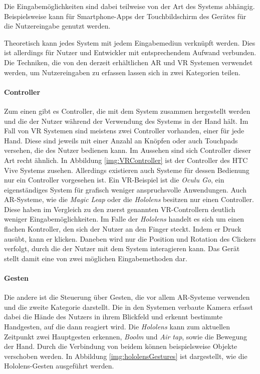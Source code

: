 Die Eingabemöglichkeiten sind dabei teilweise von der Art des Systems abhängig. 
Beispielsweise kann für Smartphone-Apps der Touchbildschirm des Gerätes für die Nutzereingabe genutzt werden. 

Theoretisch kann jedes System mit jedem Eingabemediun verknüpft werden. Dies ist allerdings für Nutzer und Entwickler mit entsprechendem Aufwand verbunden. Die Techniken, die von den derzeit erhältlichen AR und VR Systemen verwendet werden, um Nutzereingaben zu erfassen lassen sich in zwei Kategorien teilen. 
\paragraph{Controller}
Zum einen gibt es Controller, die mit dem System zusammen hergestellt werden und die der Nutzer während der Verwendung des Systems in der Hand hält. Im Fall von VR Systemen sind meistens zwei Controller vorhanden, einer für jede Hand. Diese sind jeweils mit einer Anzahl an Knöpfen oder auch Touchpads versehen, die des Nutzer bedienen kann. Im Aussehen sind sich Controller dieser Art recht ähnlich. In Abbildung \ref{img:VRController} ist der Controller des HTC Vive Systems zusehen.
Allerdings existieren auch Systeme für dessen Bedienung nur ein Controller vorgesehen ist. Ein VR-Beispiel ist die \textit{Oculu Go}, ein eigenständiges System für grafisch weniger anspruchsvolle Anwendungen. 
Auch AR-Systeme, wie die \textit{Magic Leap} oder die \textit{Hololens} besitzen nur einen Controller. Diese haben im Vergleich zu den zuerst genannten VR-Controllern deutlich weniger Eingabemöglichkeiten. Im Falle der \textit{Hololens} handelt es sich um einen flachen Kontroller, den sich der Nutzer an den Finger steckt. Indem er Druck ausübt, kann er klicken. Daneben wird nur die Position und Rotation des Clickers verfolgt, durch die der Nutzer mit dem System interagieren kann. Das Gerät stellt damit eine von zwei möglichen Eingabemethoden dar. 

\paragraph{Gesten}
Die andere ist die Steuerung über Gesten, die vor allem AR-Systeme verwenden und die zweite Kategorie darstellt.
Die in den Systemen verbaute Kamera erfasst dabei die Hände des Nutzers in ihrem Blickfeld und erkennt bestimmte Handgesten, auf die dann reagiert wird. 
Die \textit{Hololens} kann zum aktuellen Zeitpunkt zwei Hauptgesten erkennen, \textit{Boolm} und \textit{Air tap}, sowie die Bewegung der Hand. Durch die Verbindung von beidem können beispielsweise Objekte verschoben werden. In Abbildung \ref{img:hololensGestures} ist dargestellt, wie die Hololens-Gesten ausgeführt werden. 

